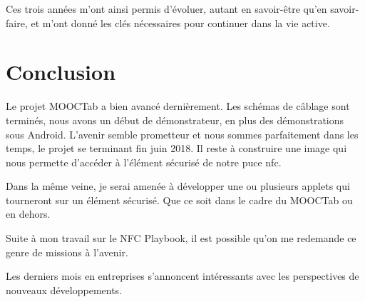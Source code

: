 \documentclass[french,12pt,a4paper,titlepage,openright,openbib]{report}
\begin{document}
Ces trois années m'ont ainsi permis d'évoluer, autant en savoir-être qu'en savoir-faire, et m'ont donné les clés nécessaires pour continuer dans la vie active.

\chapter{Conclusion}
Le projet MOOCTab a bien avancé dernièrement.
Les schémas de câblage sont terminés, nous avons un début de démonstrateur, en plus des démonstrations sous Android.
L'avenir semble prometteur et nous sommes parfaitement dans les temps, le projet se terminant fin juin 2018.
Il reste à construire une image qui nous permette d'accéder à l'élément sécurisé de notre puce \gls{nfc}.

Dans la même veine, je serai amenée à développer une ou plusieurs applets qui tourneront sur un élément sécurisé. Que ce soit dans le cadre du MOOCTab ou en dehors.

Suite à mon travail sur le NFC Playbook, il est possible qu'on me redemande ce genre de missions à l'avenir.

Les derniers mois en entreprises s'annoncent intéressants avec les perspectives de nouveaux développements.

\printglossary[title={Glossaire}]

{}

	
\end{document}
